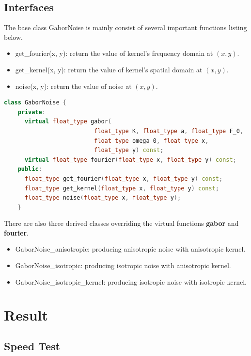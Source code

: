 \documentclass[journal, a4paper]{IEEEtran}
\begin{document}
  \subsection{Interfaces}
  The base class GaborNoise is mainly consist of several important functions listing below. 
  
  \begin{itemize}
    \item get\_fourier(x, y): return the value of kernel's frequency domain at $(x, y)$.
    \item get\_kernel(x, y): return the value of kernel's spatial domain at $(x, y)$.
    \item noise(x, y): return the value of noise at $(x, y)$.
  \end{itemize}

  \begin{lstlisting}[language=C++, caption={GaborNoise Interfaces}]
    class GaborNoise {
    private:
      virtual float_type gabor(
                          float_type K, float_type a, float_type F_0,
                          float_type omega_0, float_type x,
                          float_type y) const;
      virtual float_type fourier(float_type x, float_type y) const;
    public:
      float_type get_fourier(float_type x, float_type y) const;
      float_type get_kernel(float_type x, float_type y) const;
      float_type noise(float_type x, float_type y);
    }
  \end{lstlisting}

  There are also three derived classes overriding the virtual functions \textbf{gabor} and \textbf{fourier}. 
  
  \begin{itemize}
    \item GaborNoise\_anisotropic: producing anisotropic noise with anisotropic kernel.
    \item GaborNoise\_isotropic: producing isotropic noise with anisotropic kernel.
    \item GaborNoise\_isotropic\_kernel: producing isotropic noise with isotropic kernel.
  \end{itemize}

\section{Result}
  \subsection{Speed Test}
\end{document}
